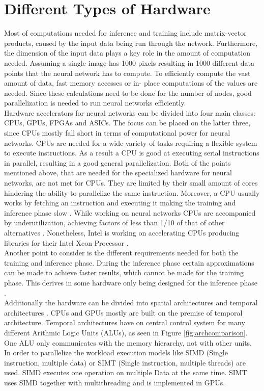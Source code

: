 \documentclass[conference]{IEEEtran}
\begin{document}
	\section{Different Types of Hardware}
	Most of computations needed for inference and training include matrix-vector products, caused by the input data being run through the network.
	Furthermore, the dimension of the input data plays a key role in the amount of computation needed. Assuming a single image has 1000 pixels resulting in 1000 different data points that the neural network has to compute. To efficiently compute the vast amount of data, fast memory accesses or in- place computations of the values are needed. Since these calculations need to be done for the number of nodes, good parallelization is needed to run neural networks efficiently.
	\\
	Hardware accelerators for neural networks can be divided into four main classes: CPUs, GPUs, FPGAs and ASICs. The focus can be placed on the latter three, since CPUs mostly fall short in terms of computational power for neural networks. 
	CPUs are needed for a wide variety of tasks requiring a flexible system to execute instructions. As a result a CPU is good at executing serial instructions in parallel, resulting in a good general parallelization.
	Both of the points mentioned above, that are needed for the specialized hardware for neural networks, are not met for CPUs. They are limited by their small amount of cores hindering the ability to parallelize the same instruction. Moreover, a CPU usually works by fetching an instruction and executing it making the training and inference phase slow \cite{capra2020updated}. While working on neural networks CPUs are accompanied by underutilization, achieving factors of less than 1/10 of that of other alternatives \cite{nurvitadhi2016accelerating}. Nonetheless, Intel is working on accelerating CPUs producing libraries for their Intel Xeon Processor \cite{intelnn}.
	\\
	Another point to consider is the different requirements needed for both the training and inference phase. During the inference phase certain approximations can be made to achieve faster results, which cannot be made for the training phase. This derives in some hardware only being designed for the inference phase \cite{jouppi2017datacenter}. 
	\\
	Additionally the hardware can be divided into spatial architectures and temporal architectures \cite{sze2017efficient}. 
	CPUs and GPUs mostly are built on the premise of temporal architecture. Temporal architectures have on central control system for many different Arithmic Logic Units (ALUs), as seen in Figure \ref{fig:archcomparison}. One ALU only communicates with the memory hierarchy, not with other units. In order to parallelize the workload execution models like SIMD (Single instruction, multiple data) or SIMT (Single instruction, multiple threads) are used. SIMD executes one operation on multiple Data at the same time. SIMT uses SIMD together with multithreading and is implemented in GPUs. 
\end{document}
